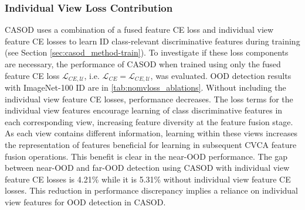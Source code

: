 \subsubsection{Individual View Loss Contribution}
\label{sec:suppmat-nomvloss}

CASOD uses a combination of a fused feature CE loss and individual view feature CE losses to learn ID class-relevant discriminative features during training (see Section \ref{sec:casod_method-train}). To investigate if these loss components are necessary, the performance of CASOD when trained using only the fused feature CE loss $\mathcal{L}_{CE,\mathcal{U}}$, i.e. $\mathcal{L}_{CE} = \mathcal{L}_{CE,\mathcal{U}}$, was evaluated. OOD detection results with ImageNet-100 ID are in \ref{tab:nomvloss_ablations}. Without including the individual view feature CE losses, performance decreases. The loss terms for the individual view features encourage learning of class discriminative features in each corresponding view, increasing feature diversity at the feature fusion stage. As each view contains different information, learning within these views increases the representation of features beneficial for learning in subsequent CVCA feature fusion operations. This benefit is clear in the near-OOD performance. The gap between near-OOD and far-OOD detection using CASOD with individual view feature CE losses is 4.21\% while it is 5.31\% without individual view feature CE losses. This reduction in performance discrepancy implies a reliance on individual view features for OOD detection in CASOD. 

